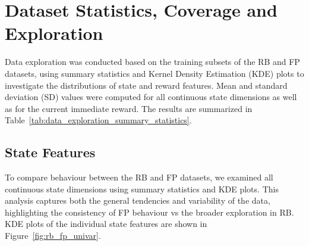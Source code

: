 \section{Dataset Statistics, Coverage and Exploration}

Data exploration was conducted based on the training subsets of the RB and FP datasets, using summary statistics and Kernel Density Estimation (KDE) plots to investigate the distributions of state and reward features. Mean and standard deviation (SD) values were computed for all continuous state dimensions as well as for the current immediate reward. The results are summarized in Table~\ref{tab:data_exploration_summary_statistics}.

\subsection{State Features}

To compare behaviour between the RB and FP datasets, we examined all continuous state dimensions using summary statistics and KDE plots. This analysis captures both the general tendencies and variability of the data, highlighting the consistency of FP behaviour vs the broader exploration in RB. KDE plots of the individual state features are shown in Figure~\ref{fig:rb_fp_univar}.


